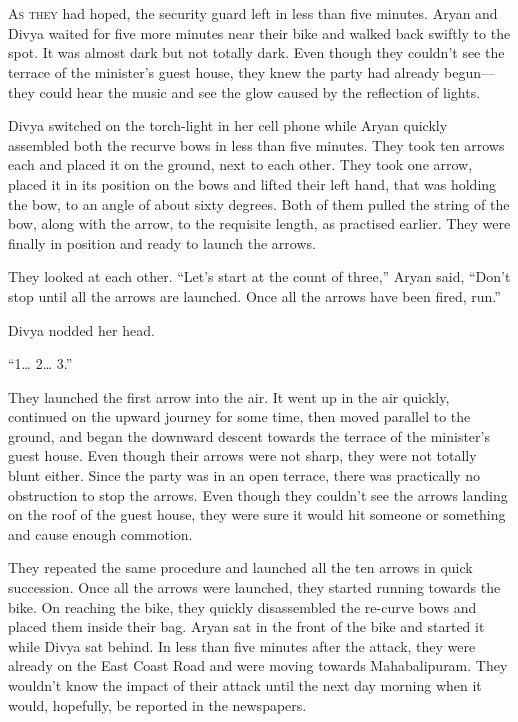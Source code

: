 \chapter{}

\lettrine{A}{s they} had hoped, the security guard left in less than five minutes. Aryan and
Divya waited for five more minutes near their bike and walked back swiftly to
the spot. It was almost dark but not totally dark. Even though they couldn't see
the terrace of the minister's guest house, they knew the party had already
begun—they could hear the music and see the glow caused by the reflection of
lights.


Divya switched on the torch-light in her cell phone while Aryan quickly
assembled both the recurve bows in less than five minutes. They took ten arrows
each and placed it on the ground, next to each other. They took one arrow,
placed it in its position on the bows and lifted their left hand, that was
holding the bow, to an angle of about sixty degrees. Both of them pulled the
string of the bow, along with the arrow, to the requisite length, as practised
earlier. They were finally in position and ready to launch the arrows.

They looked at each other. “Let's start at the count of three,” Aryan said,
“Don't stop until all the arrows are launched. Once all the arrows have been
fired, run.”

Divya nodded her head.

“1… 2… 3.”

They launched the first arrow into the air. It went up in the air quickly,
continued on the upward journey for some time, then moved parallel to the ground,
and began the downward descent towards the terrace of the minister's guest
house. Even though their arrows were not sharp, they were not totally blunt
either. Since the party was in an open terrace, there was practically no
obstruction to stop the arrows. Even though they couldn't see the arrows landing
on the roof of the guest house, they were sure it would hit someone or something
and cause enough commotion.

They repeated the same procedure and launched all the ten arrows in quick
succession. Once all the arrows were launched, they started running towards the
bike. On reaching the bike, they quickly disassembled the re-curve bows and
placed them inside their bag. Aryan sat in the front of the bike and started it
while Divya sat behind. In less than five minutes after the attack, they were
already on the East Coast Road and were moving towards Mahabalipuram. They
wouldn't know the impact of their attack until the next day morning when it
would, hopefully, be reported in the newspapers.

